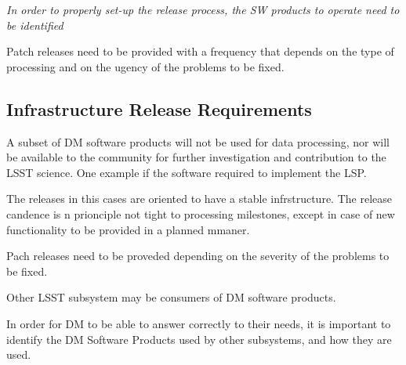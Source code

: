 \textit{In order to properly set-up the release process, the SW products to operate need to be identified}

Patch releases need to be provided with a frequency that depends on the type of processing
and on the ugency of the problems to be fixed.


\subsection{Infrastructure Release Requirements} \label{sec:infreqs}

A subset of DM software products will not be used for data processing,
nor will be available to the community for further investigation and contribution to the LSST science.
One example if the software required to implement the LSP.

The releases in this cases are oriented to have a stable infrstructure.
The release candence is n prionciple not tight to processing milestones,
except in case of new functionality to be provided in a planned mmaner.

Pach releases need to be proveded depending on the severity of the problems to be fixed.



Other LSST subsystem may be consumers of DM software products.

In order for DM to be able to answer correctly to their needs,
it is important to identify the DM Software Products used by other subsystems,
and how they are used.



